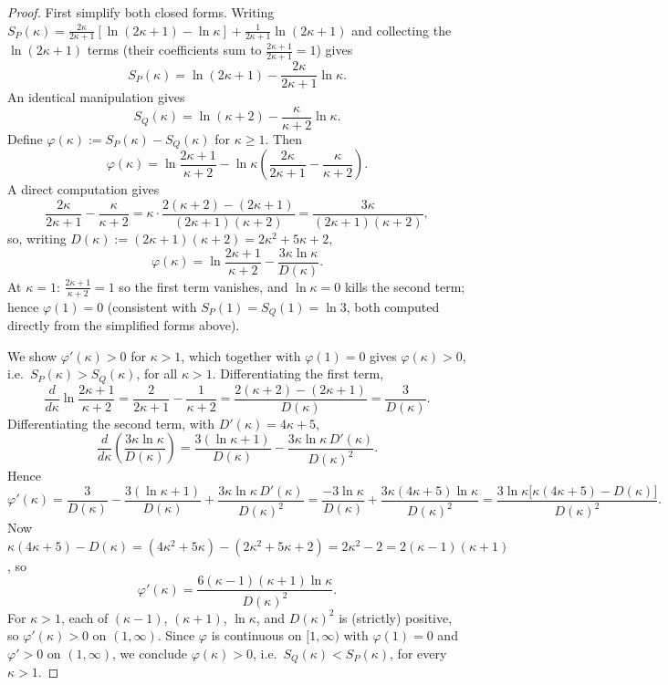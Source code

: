 \documentclass[10pt,a4paper]{amsart}
\begin{document}
\begin{proof}
First simplify both closed forms. Writing $S_P(\kappa)=\tfrac{2\kappa}{2\kappa+1}[\ln(2\kappa+1)-\ln\kappa]+\tfrac1{2\kappa+1}\ln(2\kappa+1)$ and collecting the $\ln(2\kappa+1)$ terms (their coefficients sum to $\tfrac{2\kappa+1}{2\kappa+1}=1$) gives
\[
S_P(\kappa) = \ln(2\kappa+1) - \frac{2\kappa}{2\kappa+1}\ln\kappa.
\]
An identical manipulation gives
\[
S_Q(\kappa) = \ln(\kappa+2) - \frac{\kappa}{\kappa+2}\ln\kappa.
\]
Define $\varphi(\kappa):=S_P(\kappa)-S_Q(\kappa)$ for $\kappa\ge1$. Then
\[
\varphi(\kappa) = \ln\frac{2\kappa+1}{\kappa+2} - \ln\kappa\left(\frac{2\kappa}{2\kappa+1}-\frac{\kappa}{\kappa+2}\right).
\]
A direct computation gives
\[
\frac{2\kappa}{2\kappa+1}-\frac{\kappa}{\kappa+2} = \kappa\cdot\frac{2(\kappa+2)-(2\kappa+1)}{(2\kappa+1)(\kappa+2)} = \frac{3\kappa}{(2\kappa+1)(\kappa+2)},
\]
so, writing $D(\kappa):=(2\kappa+1)(\kappa+2)=2\kappa^2+5\kappa+2$,
\[
\varphi(\kappa) = \ln\frac{2\kappa+1}{\kappa+2} - \frac{3\kappa\ln\kappa}{D(\kappa)}.
\]
At $\kappa=1$: $\tfrac{2\kappa+1}{\kappa+2}=1$ so the first term vanishes, and $\ln\kappa=0$ kills the second term; hence $\varphi(1)=0$ (consistent with $S_P(1)=S_Q(1)=\ln3$, both computed directly from the simplified forms above).

We show $\varphi'(\kappa)>0$ for $\kappa>1$, which together with $\varphi(1)=0$ gives $\varphi(\kappa)>0$, i.e.\ $S_P(\kappa)>S_Q(\kappa)$, for all $\kappa>1$. Differentiating the first term,
\[
\frac{d}{d\kappa}\ln\frac{2\kappa+1}{\kappa+2} = \frac2{2\kappa+1}-\frac1{\kappa+2} = \frac{2(\kappa+2)-(2\kappa+1)}{D(\kappa)} = \frac{3}{D(\kappa)}.
\]
Differentiating the second term, with $D'(\kappa)=4\kappa+5$,
\[
\frac{d}{d\kappa}\left(\frac{3\kappa\ln\kappa}{D(\kappa)}\right) = \frac{3(\ln\kappa+1)}{D(\kappa)} - \frac{3\kappa\ln\kappa\,D'(\kappa)}{D(\kappa)^2}.
\]
Hence
\[
\varphi'(\kappa) = \frac{3}{D(\kappa)} - \frac{3(\ln\kappa+1)}{D(\kappa)} + \frac{3\kappa\ln\kappa\,D'(\kappa)}{D(\kappa)^2}
= \frac{-3\ln\kappa}{D(\kappa)} + \frac{3\kappa(4\kappa+5)\ln\kappa}{D(\kappa)^2}
= \frac{3\ln\kappa\big[\kappa(4\kappa+5)-D(\kappa)\big]}{D(\kappa)^2}.
\]
Now $\kappa(4\kappa+5)-D(\kappa) = (4\kappa^2+5\kappa) - (2\kappa^2+5\kappa+2) = 2\kappa^2-2 = 2(\kappa-1)(\kappa+1)$, so
\[
\varphi'(\kappa) = \frac{6(\kappa-1)(\kappa+1)\ln\kappa}{D(\kappa)^2}.
\]
For $\kappa>1$, each of $(\kappa-1)$, $(\kappa+1)$, $\ln\kappa$, and $D(\kappa)^2$ is (strictly) positive, so $\varphi'(\kappa)>0$ on $(1,\infty)$. Since $\varphi$ is continuous on $[1,\infty)$ with $\varphi(1)=0$ and $\varphi'>0$ on $(1,\infty)$, we conclude $\varphi(\kappa)>0$, i.e.\ $S_Q(\kappa)<S_P(\kappa)$, for every $\kappa>1$.
\end{proof}
\end{document}
